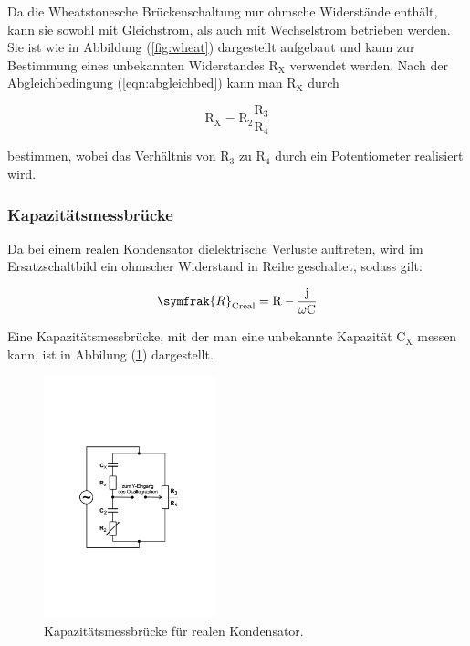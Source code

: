 \noindent
Da die Wheatstonesche Brückenschaltung nur ohmsche Widerstände enthält, kann sie sowohl mit Gleichstrom, 
als auch mit Wechselstrom betrieben werden.
Sie ist wie in Abbildung (\ref{fig:wheat}) dargestellt aufgebaut und kann zur Bestimmung eines unbekannten Widerstandes $\text{R}_\text{X}$ verwendet werden.
Nach der Abgleichbedingung (\ref{eqn:abgleichbed}) kann man $\text{R}_\text{X}$ durch

\begin{equation}
\text{R}_\text{X} = \text{R}_2 \frac{\text{R}_3}{\text{R}_4}
\end{equation}

\noindent
bestimmen, wobei das Verhältnis von $\text{R}_3$ zu $\text{R}_4$ durch ein Potentiometer realisiert wird.

\subsubsection{Kapazitätsmessbrücke}
Da bei einem realen Kondensator dielektrische Verluste auftreten, wird im Ersatzschaltbild ein ohmscher Widerstand in Reihe geschaltet, sodass gilt:

\begin{equation}
\symfrak{R}_\text{Creal}= \text{R}-\frac{\text{j}}{\omega \text{C}}
\label{eqn:r_creal}
\end{equation}

\noindent
Eine Kapazitätsmessbrücke, mit der man eine unbekannte Kapazität $\text{C}_\text{X}$ messen kann, ist in Abbilung (\ref{fig:kap}) dargestellt.

\newpage
\begin{figure}
            \centering
               \includegraphics[height=7cm]{Bilder/kapazitaet.pdf}
               \caption{Kapazitätsmessbrücke für realen Kondensator.}
               \label{fig:kap}
        \end{figure}

